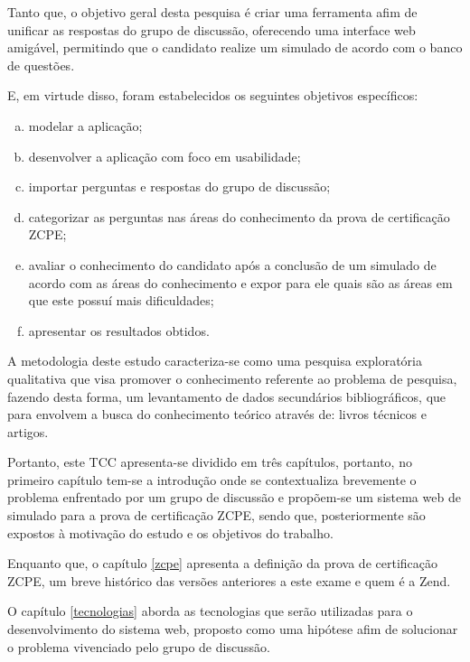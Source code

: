 
Tanto que, o objetivo geral desta pesquisa é criar uma ferramenta afim de
unificar as respostas do grupo de discussão, oferecendo uma interface web
amigável, permitindo que o candidato realize um simulado de
acordo com o banco de questões.


E, em virtude disso, foram estabelecidos os seguintes objetivos
específicos:

\begin{enumerate}[a)]
    \item modelar a aplicação;
    \item desenvolver a aplicação com foco em usabilidade;
    \item importar perguntas e respostas do grupo de discussão;
    \item categorizar as perguntas nas áreas do conhecimento da prova de
    certificação \acs{ZCPE};
    \item avaliar o conhecimento do candidato após a conclusão de um simulado 
    de acordo com as áreas do conhecimento e expor para ele quais são as áreas  em
    que este possuí mais dificuldades;
    \item apresentar os resultados obtidos.
\end{enumerate}


A metodologia deste estudo caracteriza-se como uma pesquisa exploratória
qualitativa que visa promover o conhecimento referente ao problema de pesquisa, fazendo desta forma,
um levantamento de dados secundários bibliográficos, que para
 envolvem a busca do conhecimento 
teórico através de: livros técnicos e artigos.

Portanto, este TCC apresenta-se dividido em três capítulos, portanto, no
primeiro capítulo tem-se a introdução onde se contextualiza brevemente o problema
enfrentado por um grupo de discussão e propõem-se um sistema web de
simulado para a prova de certificação \acs{ZCPE}, sendo que, posteriormente são
expostos à motivação do estudo e os objetivos do trabalho.

Enquanto que, o capítulo \ref{zcpe} apresenta a definição da prova de
certificação \acl{ZCPE}, um breve histórico das versões anteriores a este
exame e quem é a \acs{Zend}.

O capítulo \ref{tecnologias} aborda as tecnologias que serão utilizadas para o
desenvolvimento do sistema web, proposto como uma hipótese afim de solucionar
o problema vivenciado pelo grupo de discussão.


